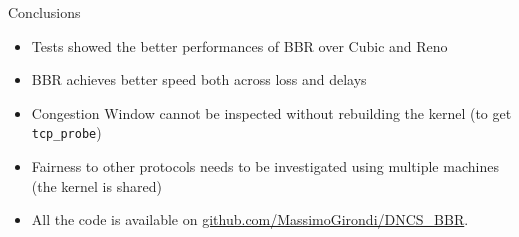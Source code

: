 \documentclass[13pt,aspectratio=43]{beamer}
\begin{document}
\begin{frame}{Conclusions}
	\begin{itemize}
		\item Tests showed the better performances of BBR over Cubic and Reno
		\item BBR achieves better speed both across loss and delays
		\item Congestion Window cannot be inspected without rebuilding the kernel (to get \texttt{tcp\_probe})
		\item Fairness to other protocols needs to be investigated using multiple machines (the kernel is shared)
        \item All the code is available on \url{github.com/MassimoGirondi/DNCS_BBR}.
	\end{itemize}
\end{frame}
\end{document}
